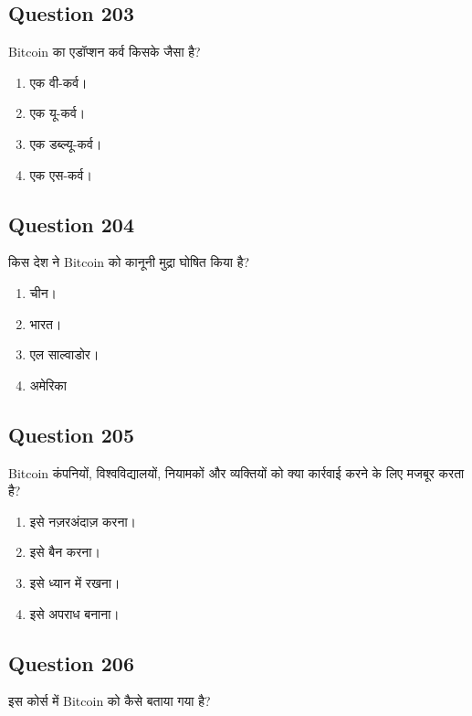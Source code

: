\documentclass[12pt,a4paper]{article}
\begin{document}
\bigskip


\subsection*{Question 203}
Bitcoin का एडॉप्शन कर्व किसके जैसा है?

\begin{enumerate}[label=\Alph*., leftmargin=*]
\item एक वी-कर्व।
\item एक यू-कर्व।
\item एक डब्ल्यू-कर्व।
\item एक एस-कर्व।
\end{enumerate}

\bigskip


\subsection*{Question 204}
किस देश ने Bitcoin को कानूनी मुद्रा घोषित किया है?

\begin{enumerate}[label=\Alph*., leftmargin=*]
\item चीन।
\item भारत।
\item एल साल्वाडोर।
\item अमेरिका
\end{enumerate}

\bigskip


\subsection*{Question 205}
Bitcoin कंपनियों, विश्वविद्यालयों, नियामकों और व्यक्तियों को क्या कार्रवाई करने के लिए मजबूर करता है?

\begin{enumerate}[label=\Alph*., leftmargin=*]
\item इसे नज़रअंदाज़ करना।
\item इसे बैन करना।
\item इसे ध्यान में रखना।
\item इसे अपराध बनाना।
\end{enumerate}

\bigskip


\subsection*{Question 206}
इस कोर्स में Bitcoin को कैसे बताया गया है?
\end{document}
